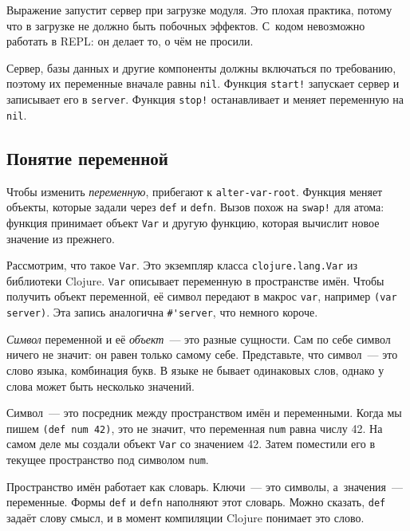 \fi

Выражение запустит сервер при загрузке модуля. Это плохая практика, потому что в
загрузке не должно быть побочных эффектов. С~кодом невозможно работать в REPL:
он делает то, о чём не просили.

Сервер, базы данных и другие компоненты должны включаться по требованию, поэтому
их переменные вначале равны \verb|nil|. Функция \verb|start!| запускает
сервер и записывает его в \verb|server|. Функция \verb|stop!| останавливает
и меняет переменную на \verb|nil|.

\subsection{Понятие переменной}


\label{var-section}

Чтобы изменить \emph{переменную}, прибегают к \verb|alter-var-root|. Функция
меняет объекты, которые задали через \verb|def| и \verb|defn|. Вызов похож
на \verb|swap!| для атома: функция принимает объект \verb|Var| и другую
функцию, которая вычислит новое значение из прежнего.


Рассмотрим, что такое \verb|Var|. Это экземпляр класса \verb|clojure.lang.Var|
из библиотеки Clojure. \verb|Var| описывает переменную в пространстве имён.
Чтобы получить объект переменной, её символ передают в макрос \verb|var|,
например \verb|(var server)|. Эта запись аналогична \verb|#'server|,
что немного короче.



\emph{Символ} переменной и её \emph{объект}~--- это разные сущности. Сам по себе
символ ничего не значит: он равен только самому себе. Представьте, что символ~---
это слово языка, комбинация букв. В языке не бывает одинаковых слов, однако у
слова может быть несколько значений.


Символ~--- это посредник между пространством имён и переменными. Когда мы пишем
\verb|(def num 42)|, это не значит, что переменная \verb|num| равна числу
42. На самом деле мы создали объект \verb|Var| со значением 42. Затем
поместили его в текущее пространство под символом \verb|num|.

Пространство имён работает как словарь. Ключи~--- это символы, а~значения~---
переменные. Формы \verb|def| и \verb|defn| наполняют этот словарь. Можно
сказать, \verb|def| задаёт слову смысл, и в момент компиляции Clojure
понимает это слово.

